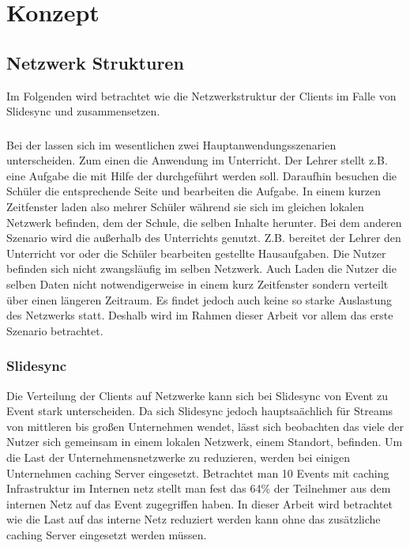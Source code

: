 \chapter{Konzept}\label{ch:concept}
%

\section{Netzwerk Strukturen}

Im Folgenden wird betrachtet wie die Netzwerkstruktur der Clients im Falle von Slidesync und \schulCloud zusammensetzen.
\subsection{\schulCloud}
Bei der \schulCloud lassen sich im wesentlichen zwei Hauptanwendungsszenarien unterscheiden. Zum einen die Anwendung im Unterricht. Der Lehrer stellt z.B. eine Aufgabe die mit Hilfe der \schulCloud durchgeführt werden soll. Daraufhin besuchen die Schüler die entsprechende Seite und bearbeiten die Aufgabe. In einem kurzen Zeitfenster laden also mehrer Schüler während sie sich im gleichen lokalen Netzwerk befinden, dem der Schule, die selben Inhalte herunter. Bei dem anderen Szenario wird die \schulCloud außerhalb des Unterrichts genutzt. Z.B. bereitet der Lehrer den Unterricht vor oder die Schüler bearbeiten gestellte Hausaufgaben. Die Nutzer befinden sich nicht zwangsläufig im selben Netzwerk. Auch Laden die Nutzer die selben Daten nicht notwendigerweise in einem kurz Zeitfenster sondern verteilt über einen längeren Zeitraum. Es findet jedoch auch keine so starke Auslastung des Netzwerks statt. Deshalb wird im Rahmen dieser Arbeit vor allem das erste Szenario betrachtet.

\subsection{Slidesync}
Die Verteilung der Clients auf Netzwerke kann sich bei Slidesync von Event zu Event stark unterscheiden. Da sich Slidesync jedoch hauptsaächlich für Streams von mittleren bis großen Unternehmen wendet, lässt sich beobachten das viele der Nutzer sich gemeinsam in einem lokalen Netzwerk, einem Standort, befinden. Um die Last der Unternehmensnetzwerke zu reduzieren, werden bei einigen Unternehmen caching Server eingesetzt. Betrachtet man 10 Events mit caching Infrastruktur im Internen netz stellt man fest das 64\% der Teilnehmer aus dem internen Netz  auf das Event zugegriffen haben. In dieser Arbeit wird betrachtet wie die Last auf das interne Netz reduziert werden kann ohne das zusätzliche caching Server eingesetzt werden müssen.

